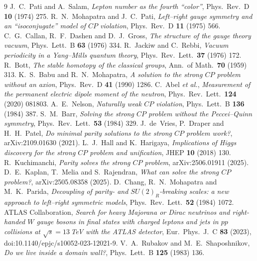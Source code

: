 \documentclass[11pt]{article}
\begin{document}
\begin{thebibliography}{9}
 J.~C.~Pati and A.~Salam, \emph{Lepton number as the fourth ``color''}, Phys.\ Rev.\ D \textbf{10} (1974) 275.
 R.~N.~Mohapatra and J.~C.~Pati, \emph{Left--right gauge symmetry and an ``isoconjugate'' model of $CP$ violation}, Phys.\ Rev.\ D \textbf{11} (1975) 566.
 C.~G.~Callan, R.~F.~Dashen and D.~J.~Gross, \emph{The structure of the gauge theory vacuum}, Phys.\ Lett.\ B \textbf{63} (1976) 334.
 R.~Jackiw and C.~Rebbi, \emph{Vacuum periodicity in a Yang--Mills quantum theory}, Phys.\ Rev.\ Lett.\ \textbf{37} (1976) 172.
 R.~Bott, \emph{The stable homotopy of the classical groups}, Ann.\ of Math.\ \textbf{70} (1959) 313.
 K.~S.~Babu and R.~N.~Mohapatra, \emph{A solution to the strong $CP$ problem without an axion}, Phys.\ Rev.\ D \textbf{41} (1990) 1286.
 C.~Abel \emph{et al.}, \emph{Measurement of the permanent electric dipole moment of the neutron}, Phys.\ Rev.\ Lett.\ \textbf{124} (2020) 081803.
 A.~E.~Nelson, \emph{Naturally weak $CP$ violation}, Phys.\ Lett.\ B \textbf{136} (1984) 387.
 S.~M.~Barr, \emph{Solving the strong $CP$ problem without the Peccei--Quinn symmetry}, Phys.\ Rev.\ Lett.\ \textbf{53} (1984) 329.
 J.~de~Vries, P.~Draper and H.~H.~Patel, \emph{Do minimal parity solutions to the strong $CP$ problem work?}, arXiv:2109.01630 (2021).
 L.~J.~Hall and K.~Harigaya, \emph{Implications of Higgs discovery for the strong $CP$ problem and unification}, JHEP \textbf{10} (2018) 130.
 R.~Kuchimanchi, \emph{Parity solves the strong $CP$ problem}, arXiv:2506.01911 (2025).
 D.~E.~Kaplan, T.~Melia and S.~Rajendran, \emph{What can solve the strong $CP$ problem?}, arXiv:2505.08358 (2025).
 D.~Chang, R.~N.~Mohapatra and M.~K.~Parida, \emph{Decoupling of parity- and $SU(2)_R$-breaking scales: a new approach to left--right symmetric models}, Phys.\ Rev.\ Lett.\ \textbf{52} (1984) 1072.
 ATLAS Collaboration, \emph{Search for heavy Majorana or Dirac neutrinos and right-handed $W$ gauge bosons in final states with charged leptons and jets in $pp$ collisions at $\sqrt{s}=13$\,TeV with the ATLAS detector}, Eur.\ Phys.\ J.\ C \textbf{83} (2023), doi:10.1140/epjc/s10052-023-12021-9.
 V.~A.~Rubakov and M.~E.~Shaposhnikov, \emph{Do we live inside a domain wall?}, Phys.\ Lett.\ B \textbf{125} (1983) 136.

\end{thebibliography}
\end{document}
